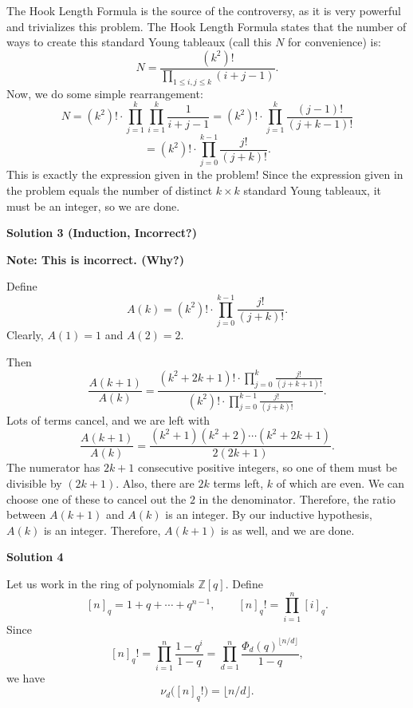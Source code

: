 \begin{enumerate}
 The Hook Length Formula is the source of the controversy, as it is very powerful and trivializes this problem. The Hook Length Formula states that the number of ways to create this standard Young tableaux (call this $N$ for convenience) is:
 \[N = \frac{\left(k^2\right)!}{\prod_{1\le i, j\le k}(i+j-1)}.\]Now, we do some simple rearrangement:
 \[N = \left(k^2\right)!\cdot\prod_{j=1}^{k}\prod_{i=1}^{k}\frac{1}{i+j-1} = \left(k^2\right)!\cdot\prod_{j=1}^{k}\frac{\left(j-1\right)!}{\left(j+k-1\right)!}\] 
 \[= \left(k^2\right)!\cdot\prod_{j=0}^{k-1}\frac{j!}{\left(j+k\right)!}.\]This is exactly the expression given in the problem! Since the expression given in the problem equals the number of distinct $k\times k$ standard Young tableaux, it must be an integer, so we are done.

 



\textbf{Solution 3 (Induction, Incorrect?)}

\textbf{Note: This is incorrect. (Why?)}

 
Define 
 \[A(k) = \left(k^2\right)!\cdot\prod_{j=0}^{k-1}\frac{j!}{\left(j+k\right)!}.\] Clearly, $A(1) = 1$ and $A(2) = 2.$

 Then 
 \[\frac{A(k+1)}{A(k)} = \frac{\left(k^2+2k+1\right)!\cdot\prod_{j=0}^{k}\frac{j!}{\left(j+k+1\right)!}}{\left(k^2\right)!\cdot\prod_{j=0}^{k-1}\frac{j!}{\left(j+k\right)!}}.\] Lots of terms cancel, and we are left with 
 \[\frac{A(k+1)}{A(k)} = \frac{(k^2+1)(k^2+2)\cdots(k^2+2k+1)}{2(2k+1)}.\] The numerator has $2k+1$ consecutive positive integers, so one of them must be divisible by $(2k+1).$ Also, there are $2k$ terms left, $k$ of which are even. We can choose one of these to cancel out the $2$ in the denominator. Therefore, the ratio between $A(k+1)$ and $A(k)$ is an integer. By our inductive hypothesis, $A(k)$ is an integer. Therefore, $A(k+1)$ is as well, and we are done.

 



\textbf{Solution 4}

Let us work in the ring of polynomials $\mathbb{Z}[q]$.  Define
 \[[n]_q = 1 + q + \cdots + q^{n-1}, \qquad [n]_q! = \prod_{i=1}^n [i]_q.\]Since
 \[[n]_q! = \prod_{i=1}^n\frac{1 - q^i}{1 - q} = \prod_{d=1}^n \frac{\Phi_d(q)^{\lfloor n/d\rfloor}}{1 - q},\]we have
 \[\nu_d\bigl([n]_q!\bigr) = \lfloor n/d\rfloor.\]


\end{enumerate}
